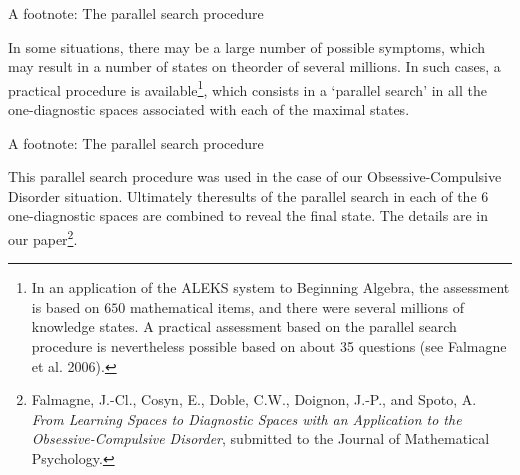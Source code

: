 \documentclass{beamer}
\def\pha{\phantom}
\begin{document}
\begin{frame}{A footnote: The parallel search procedure}
\center
\begin{minipage}{10cm} In some situations, there may be a large number of possible symptoms, which may result in a number of states on the\linebreak order of several millions. In such cases, a practical procedure is available\footnote{In an application of the {\sc ALEKS} system to Beginning Algebra, the assessment is based on $650$ mathematical items, and there were several millions of knowledge states. A practical assessment based on the parallel search procedure is nevertheless possible based on about 35 questions (see Falmagne et al. 2006).}, which consists in a `parallel search' in all the one-diagnostic spaces associated with each of the maximal states. 
\pha{x}

\pha{x}

\pha{x}

\end{minipage}
\vspace{.5cm}

\end{frame}
\begin{frame}{A footnote: The parallel search procedure}
\center
\begin{minipage}{10cm} This parallel search procedure was used in the case of our Obsessive-Compulsive Disorder situation. Ultimately the\linebreak results of the parallel search in each of the 6 one-diagnostic spaces are combined to reveal the final state. The details are in our paper\footnote{Falmagne, J.-Cl., Cosyn, E., Doble, C.W., Doignon, J.-P., and Spoto, A. {\sl From Learning Spaces to Diagnostic Spaces
with an Application to the Obsessive-Compulsive Disorder}, submitted to the Journal of Mathematical Psychology.}.
\pha{x}

\pha{x}

\pha{x}

\pha{x}

\pha{x}


\end{minipage}
\vspace{.5cm}

\end{frame}
\end{document}
